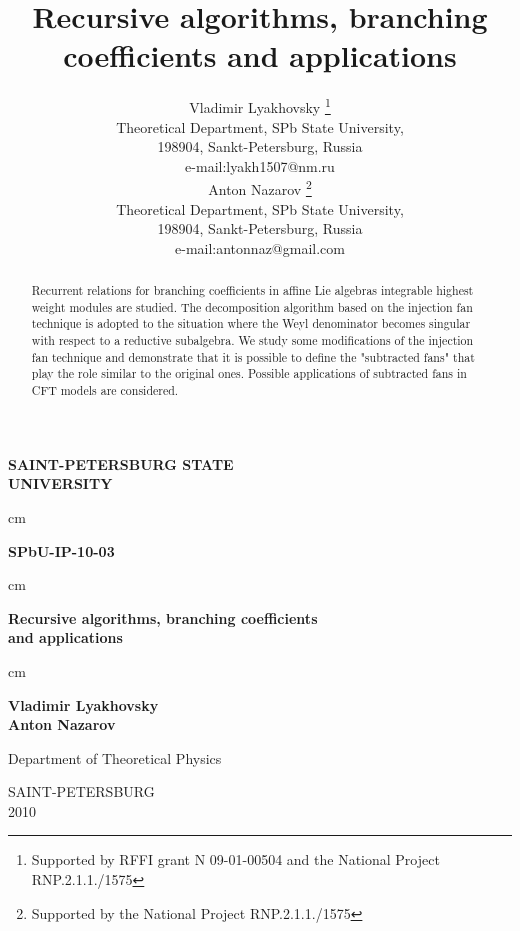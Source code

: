 \documentclass[a4paper,12pt]{article}
\theoremstyle{definition} \newtheorem{Def}{Definition}
\begin{document}
\thispagestyle{empty}

\begin{center}
{\Large \bf SAINT-PETERSBURG STATE\\[0.5cm] UNIVERSITY}
\end{center}
 cm
\begin{flushright}
{\large \bf SPbU-IP-10-03}
\end{flushright}
\hfill {}
 cm
\begin{center}
{\Huge \bf Recursive algorithms, branching coefficients \\ and applications\\[0.5cm]
}
\end{center}
 cm
\begin{center}
{\Large \bf
Vladimir Lyakhovsky\\[2mm]
Anton Nazarov}
\end{center}
\vfill
\begin{center}
{\large Department of Theoretical Physics\\
}
\end{center}
\vfill
\begin{center}
SAINT-PETERSBURG \\
2010
\end{center}

\newpage

\title{\textbf{{\Large {Recursive algorithms, branching coefficients and applications}}}}
\author{Vladimir Lyakhovsky \thanks{ Supported by
 RFFI grant N 09-01-00504 and the National Project RNP.2.1.1./1575 }\\
Theoretical Department, SPb State University,\\
198904, Sankt-Petersburg, Russia \\
e-mail:lyakh1507@nm.ru \\
[5mm] Anton Nazarov \thanks{ Supported by
the National Project RNP.2.1.1./1575 }\\
Theoretical Department, SPb State University,\\
198904, Sankt-Petersburg, Russia \\
e-mail:antonnaz@gmail.com
}

\begin{abstract}
  Recurrent relations for branching coefficients in affine Lie algebras integrable highest weight modules are studied. The decomposition algorithm based on the injection fan technique is adopted to the situation where the Weyl denominator becomes singular with respect to a reductive subalgebra. We study some modifications of the injection fan technique and demonstrate that it is possible to define the "subtracted fans" that play the role similar to the original ones. Possible applications of subtracted fans in CFT models are considered.
\end{abstract}
\end{document}
